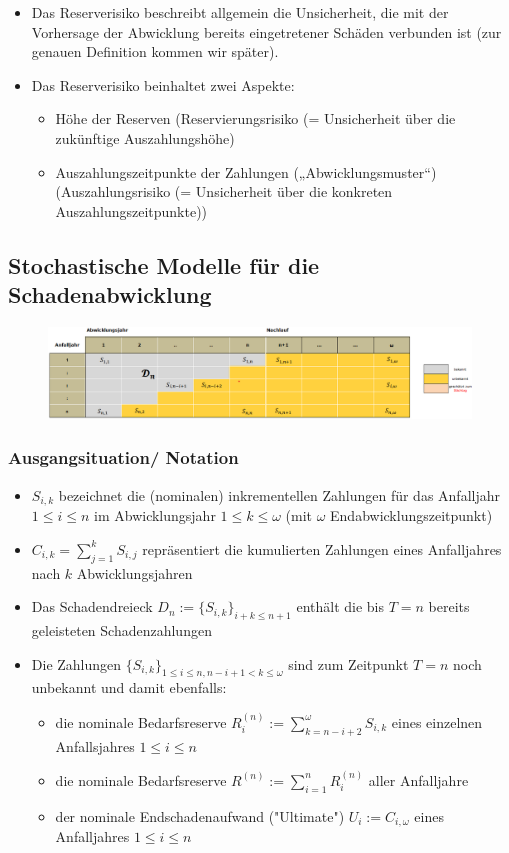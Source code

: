 \documentclass[12pt]{report}
\theoremstyle{dotless}
\theoremstyle{definition}
\begin{document}
\begin{itemize}
\item Das Reserverisiko beschreibt allgemein die Unsicherheit, die mit der Vorhersage der Abwicklung bereits eingetretener Schäden verbunden ist (zur genauen Definition kommen wir später).
\item Das Reserverisiko beinhaltet zwei Aspekte:
\begin{itemize}
\item Höhe der Reserven (Reservierungsrisiko (= Unsicherheit über die zukünftige Auszahlungshöhe)
\item Auszahlungszeitpunkte der Zahlungen („Abwicklungsmuster“) (Auszahlungsrisiko (= Unsicherheit über die konkreten Auszahlungszeitpunkte))
\end{itemize}

\end{itemize}

\subsection{Stochastische Modelle für die Schadenabwicklung}

\begin{figure}[ht]
	\centering
	\includegraphics[width= \textwidth]{Bilder/Dreieck.png}
\end{figure}

\subsubsection{Ausgangsituation/ Notation}
\begin{itemize}
\item $S_{i,k}$ bezeichnet die (nominalen) inkrementellen Zahlungen für das Anfalljahr $1 \leq i \leq n$ im Abwicklungsjahr $1 \leq k \leq \omega$ (mit $\omega$ Endabwicklungszeitpunkt)
\item $C_{i,k} = \sum^k_{j=1} S_{i,j}$ repräsentiert die kumulierten Zahlungen eines Anfalljahres nach $k$ Abwicklungsjahren
\item Das Schadendreieck $D_n:= \{S_{i,k} \}_{i+k\leq n+1}$ enthält die bis $T=n$ bereits geleisteten Schadenzahlungen
\item Die Zahlungen $\{S_{i,k}\} _{1\leq i \leq n, n-i+1 < k \leq \omega}$ sind zum Zeitpunkt $T=n$ noch unbekannt und damit ebenfalls:
\begin{itemize}
\item die nominale Bedarfsreserve $R^{(n)}_i := \sum^\omega_{k=n-i+2}S_{i,k}$ eines einzelnen Anfallsjahres $1\leq i \leq n$
\item die nominale Bedarfsreserve $R^{(n)} := \sum^n_{i=1} R_i^{(n)}$ aller Anfalljahre
\item der nominale Endschadenaufwand ("Ultimate") $U_i:=C_{i,\omega}$ eines Anfalljahres $1\leq i \leq n$
\end{itemize}
\end{itemize}
\end{document}
